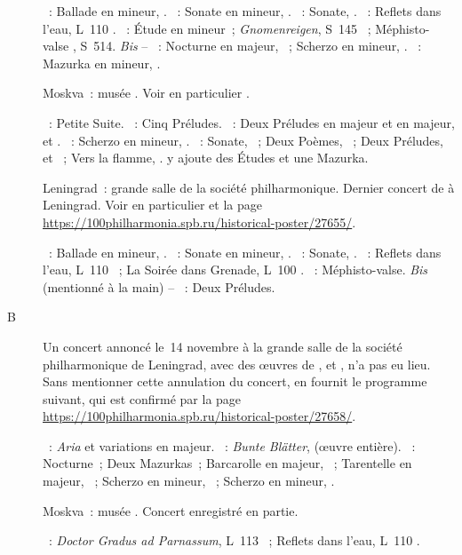 \begin{description}
 \textsc{\Grieg{}}~: Ballade en \kG mineur, .
 \textsc{\Chopin{}}~: Sonate en \kB \Flat mineur, .
 \textsc{\Scriabine{}}~: Sonate, .
 \textsc{\Debussy{}}~: Reflets dans l'eau, L~110 .
 \textsc{\Liszt{}}~: Étude en \kF mineur~; \emph{Gnomenreigen}, S~145
 ~; Méphisto-valse , S~514.
 \emph{Bis} -- \textsc{\Chopin{}}~: Nocturne en \kF \Sharp majeur, 
 ~; Scherzo en \kB mineur, .
 \textsc{\Scriabine{}}~: Mazurka en \kE mineur,  .
 \item[\DateWithWeekDay{1954-10-16}]
 Moskva~: musée \Scriabine{}.
 Voir en particulier \citet[p.~448]{Milshteyn82a}.

 \textsc{\Borodine{}}~: Petite Suite.
 \textsc{\Liadov{}}~: Cinq Préludes.
 \textsc{\Rachmaninov{}}~: Deux Préludes en \kD majeur et en \kG majeur,
   et  .
 \textsc{\Chopin{}}~: Scherzo en \kB mineur, .
 \textsc{\Scriabine{}}~: Sonate, ~; Deux Poèmes, ~; Deux
 Préludes,   et  ~; Vers la flamme,
 .
 \citet[p.~178]{Nekrasova08} y ajoute des Études et une Mazurka.
 \item[\DateWithWeekDay{1954-11-12}]
 Leningrad~: grande salle de la société philharmonique.
 Dernier concert de \VSofronitsky{} à Leningrad.
 Voir en particulier \citet[p.~444-445]{Milshteyn82a} et la page
 \href{https://100philharmonia.spb.ru/historical-poster/27655/}%
 {https://100philharmonia.spb.ru/historical-poster/27655/}.

 \textsc{\Grieg{}}~: Ballade en \kG mineur, .
 \textsc{\Chopin{}}~: Sonate en \kB \Flat mineur, .
 \textsc{\Scriabine{}}~: Sonate, .
 \textsc{\Debussy{}}~: Reflets dans l'eau, L~110 ~; La Soirée dans
 Grenade, L~100 .
 \textsc{\Liszt{}}~: Méphisto-valse.
 \emph{Bis} (mentionné à la main) -- \textsc{\Debussy{}}~: Deux Préludes.
 \item[B\DateWithWeekDay{1954-11-14}]
 Un concert annoncé le~14 novembre à la grande salle de la société
 philharmonique de Leningrad, avec des œuvres de \Haendel{}, \Schumann{} et
 \Chopin{}, n'a pas eu lieu.
 Sans mentionner cette annulation du concert, \citet[p.~178]{Nekrasova08} en
 fournit le programme suivant, qui est confirmé par la page
 \href{https://100philharmonia.spb.ru/historical-poster/27658/}%
 {https://100philharmonia.spb.ru/historical-poster/27658/}.

 \textsc{\Haendel{}}~: \emph{Aria} et variations en \kE majeur.
 \textsc{\Schumann{}}~: \emph{Bunte Blätter},  (œuvre entière).
 \textsc{\Chopin{}}~: Nocturne~; Deux Mazurkas~; Barcarolle en \kF \Sharp
 majeur, ~; Tarentelle en \kA \Flat majeur, ~; Scherzo
  en \kB \Flat mineur, ~; Scherzo  en \kC
 \Sharp mineur, .
 \item[\DateWithWeekDay{1954-12-29}]
 Moskva~: musée \Scriabine{}.
 Concert enregistré en partie.

 \textsc{\Debussy{}}~: \emph{Doctor Gradus ad Parnassum}, L~113 ~;
 Reflets dans l'eau, L~110 .
\end{description}

